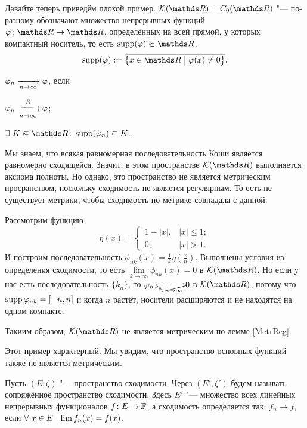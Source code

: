 Давайте теперь приведём плохой пример. $\mathcal K(\R) = C_0(\R)$ "--- по-разному обозначают множество непрерывных функций $\phi\colon \R\to\R$, определённых на всей прямой, у которых компактный носитель, то есть $\supp(\phi) \spp \R$.
\[
  \supp(\phi):=\overline{\big\{x\in\R\bigm|\phi(x)\ne0\big\}}.
\]
\begin{Def}
  $\varphi_n\xrightarrow[n\rightarrow\infty]{}\varphi$, если
\begin{roItems}
\item $\phi_n \rsh[R]n\phi$;
\item $\exists\ K\spp\R\colon \supp(\phi_n)\subset K$.
\end{roItems}
\end{Def}

Мы знаем, что всякая равномерная последовательность Коши является равномерно сходящейся. Значит, в этом пространстве $\mathcal K(\R)$ выполняется аксиома полноты. Но однако, это пространство не является метрическим просранством, поскольку сходимость не является регулярным. То есть не существует метрики, чтобы сходимость по метрике совпадала с данной.

\begin{Proof}
Рассмотрим функцию
\[
\eta(x) = \begin{cases}
  1-|x|,&|x|\le1;\\
 0,&|x|>1.
\end{cases}
\]
И построим последовательность $\phi_{nk}(x) = \frac1k\eta\left(\frac xn\right)$. Выполнены условия из определения сходимости, то есть $\lim\limits_{k\to\infty}\phi_{nk}(x) = 0$ в $\mathcal K(\R)$. Но если у нас есть последовательность $\{k_n\}$, то $\varphi_{n\,k_n}\cancel{\xrightarrow[n\rightarrow\infty]{}}0$ в $\mathcal K(\R)$, потому что $\operatorname{supp}\varphi_{nk} = [-n,n]$ и когда $n$ растёт, носители расширяются и не находятся на одном компакте. 

Такиим образом, $\mathcal K(\R)$ не является метрическим по лемме \eqref{MetrReg}.
\end{Proof}

Этот пример характерный. Мы увидим, что пространство основных функций также не является метрическим.

\begin{Def}
Пусть $(E,\zeta)$ "--- пространство сходимости. Через $(E',\zeta')$ будем называть сопряжённое пространство сходимости. Здесь $E'$ "--- множество всех линейных непрерывных функционалов $f\colon E\rightarrow\mathbb F$, а сходимость определяется так: $f_n\to f$, если $\forall\ x\in E\pau \lim f_n(x) = f(x)$.
\end{Def}

